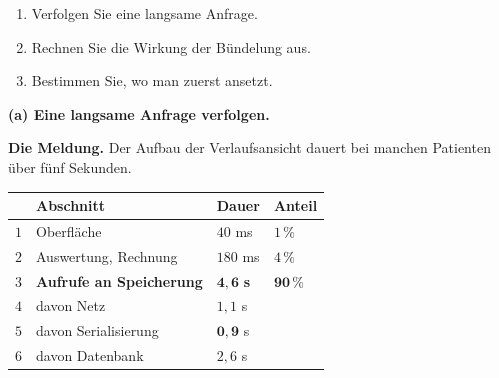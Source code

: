 \begin{aufgabe}
\begin{enumerate}[label=(\alph*)]
\item Verfolgen Sie eine langsame Anfrage.
\item Rechnen Sie die Wirkung der Bündelung aus.
\item Bestimmen Sie, wo man zuerst ansetzt.
\end{enumerate}

\loesung
\textbf{(a) Eine langsame Anfrage verfolgen.}

\textbf{Die Meldung.} Der Aufbau der Verlaufsansicht dauert bei manchen Patienten über fünf Sekunden.

\begin{center}
{\small
\renewcommand{\arraystretch}{1.45}
\begin{tabular}{@{}P{1.0cm}P{3.2cm}P{2.0cm}P{2.2cm}@{}}
\toprule
& \textbf{Abschnitt} & \textbf{Dauer} & \textbf{Anteil}\\
\midrule
$1$ & Oberfläche & $40$ ms & $1\,\%$\\
$2$ & Auswertung, Rechnung & $180$ ms & $4\,\%$\\
$3$ & \textbf{Aufrufe an Speicherung} & \textcolor{akzent}{$\mathbf{4{,}6}$ \textbf{s}} & \textcolor{akzent}{$\mathbf{90\,\%}$}\\
$4$ & davon Netz & $1{,}1$ s & \\
$5$ & davon Serialisierung & $\mathbf{0{,}9}$ s & \\
$6$ & davon Datenbank & $2{,}6$ s & \\
\bottomrule
\end{tabular}}
\end{center}

\begin{center}
\begin{minipage}{0.88\textwidth}
\end{minipage}
\end{center}

\begin{center}
\end{center}


\end{aufgabe}
